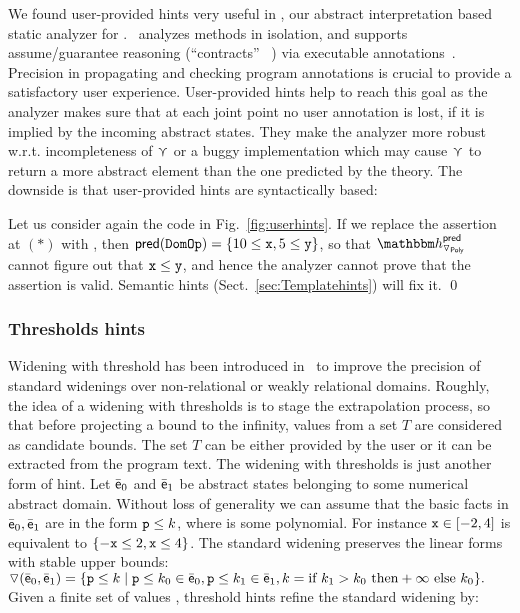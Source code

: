 \documentclass[sttt]{svjour}
\newcommand{\sopra}{}
\begin{document}
We found user-provided hints very useful in \Clousot, our abstract interpretation based static analyzer for \NET.
\Clousot\ analyzes methods in isolation, and supports assume/guarantee
reasoning (``contracts'' ~\cite{meyer97}) via executable annotations~\cite{FoxtrotClousot}.
Precision in propagating and checking program annotations is crucial to provide a satisfactory user experience.
User-provided hints help to reach this goal as the analyzer makes sure that at each joint point no user annotation is lost, if it is implied by the incoming abstract states.
They make the analyzer more robust w.r.t. incompleteness of $\curlyvee$ or a buggy implementation which may cause $\curlyvee$ to return a more abstract element than the one predicted by the theory.
The downside is that user-provided hints are syntactically based:
\begin{example}
\label{ex:syntactic}
Let us consider again the code in Fig.~\ref{fig:userhints}.
If we replace the assertion at $\mathtt{(*)}$ with , then $\mathsf{pred}(\mathtt{DomOp}) =  \{ 10 \leq \mathtt{x} , 5 \leq \mathtt{y} \}$, so that  $\hint{\widening_{\Poly}}^{\mathsf{pred}}$ cannot figure out that $\mathtt{x} \leq \mathtt{y}$, and hence the analyzer cannot prove that the assertion is valid.
Semantic hints (Sect.~\ref{sec:Templatehints}) will fix it. \qed
\end{example}

\subsubsection{Thresholds hints}
Widening with threshold has been introduced in~\cite{BlanchetCousotEtAl03} to improve the precision of standard widenings over non-relational or weakly relational domains.
Roughly, the idea of a widening with thresholds is to stage the extrapolation process, so that before projecting a bound to the infinity, values from a set $T$ are considered as candidate bounds.
The set $T$ can be either provided by the user or it can be extracted from the program text.
The widening with thresholds is just another form of hint.
Let $\bar{\mathsf{\mathsf{e}}}_0$ and $\bar{\mathsf{\mathsf{e}}}_1$ be abstract states belonging to some numerical abstract domain.
Without loss of generality we can assume that the basic facts in $\bar{\mathsf{\mathsf{e}}}_0, \bar{\mathsf{\mathsf{e}}}_1$ are in the form $\mathtt{p} \leq k$, where  is some polynomial.
For instance $\mathtt{x} \in [-2, 4]$ is equivalent to $\{ -\mathtt{x} \leq 2, \mathtt{x} \leq 4 \}$.
The standard widening preserves the linear forms with stable upper bounds:
\(
\triangledown (\bar{\mathsf{\mathsf{e}}}_0,\bar{\mathsf{\mathsf{e}}}_1) = \{ \mathtt{p} \leq k \mid \mathtt{p} \leq k_0\in \bar{\mathsf{\mathsf{e}}}_0, \mathtt{p} \leq k_1\in \bar{\mathsf{\mathsf{e}}}_1, k = \text{if } k_1 > k_0 \text{ then} +\infty \text{ else }  k_0\}.
\)
Given a finite set of values , threshold hints refine the standard widening by:
\end{document}
